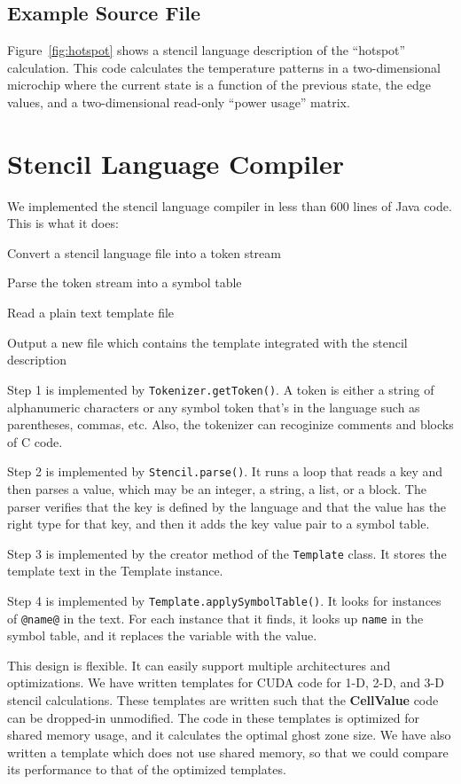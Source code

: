 \documentclass{styles/sig-alternate}
\begin{document}
\subsection{Example Source File}

Figure~\ref{fig:hotspot} shows a stencil language description of the
``hotspot'' calculation.  This code calculates the temperature
patterns in a two-dimensional microchip where the current state is a
function of the previous state, the edge values, and a two-dimensional
read-only ``power usage'' matrix.

\section{Stencil Language Compiler}

We implemented the stencil language compiler in less than 600 lines of
Java code.  This is what it does:
\begin{enumerate*}
\item Convert a stencil language file into a token stream
\item Parse the token stream into a symbol table
\item Read a plain text template file
\item Output a new file which contains the template integrated with
  the stencil description
\end{enumerate*}

Step 1 is implemented by {\tt Tokenizer.getToken()}.  A token is
either a string of alphanumeric characters or any symbol token that's
in the language such as parentheses, commas, etc.  Also, the tokenizer
can recoginize comments and blocks of C code.

Step 2 is implemented by {\tt Stencil.parse()}.  It runs a loop that
reads a key and then parses a value, which may be an integer, a
string, a list, or a block.  The parser verifies that the key is
defined by the language and that the value has the right type for that
key, and then it adds the key value pair to a symbol table.

Step 3 is implemented by the creator method of the {\tt Template}
class.  It stores the template text in the Template instance.

Step 4 is implemented by {\tt Template.applySymbolTable()}.  It looks
for instances of {\tt @name@} in the text.  For each instance that it
finds, it looks up {\tt name} in the symbol table, and it replaces the
variable with the value.

This design is flexible.  It can easily support multiple architectures
and optimizations.  We have written templates for CUDA code for 1-D,
2-D, and 3-D stencil calculations.  These templates are written such
that the {\bf CellValue} code can be dropped-in unmodified.  The code
in these templates is optimized for shared memory usage, and it
calculates the optimal ghost zone size.  We have also written a
template which does not use shared memory, so that we could compare
its performance to that of the optimized templates.
\end{document}
